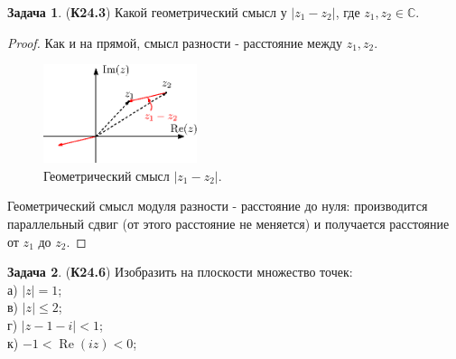 \documentclass[12pt]{article}
\newcommand{\MC}{\mathbb{C}}
\theoremstyle{definition}
\newtheorem{problem}{Задача}
\DeclareMathOperator{\RE}{\operatorname{Re}}
\begin{document}
\begin{problem}(\textbf{К24.3}) 
	Какой геометрический смысл у $|z_1 - z_2|$, где $z_1, z_2 \in \MC$.
\end{problem}
\begin{proof}
	Как и на прямой, смысл разности - расстояние между $z_1,z_2$.
	\begin{figure}[H]
		\centering
		\includegraphics[width=0.4\textwidth]{AL1S1_4.eps}
		\caption{Геометрический смысл $|z_1 - z_2|$.}
		\label{1_4}
	\end{figure}
	Геометрический смысл модуля разности - расстояние до нуля: производится параллельный сдвиг (от этого расстояние не меняется) и получается расстояние от $z_1$ до $z_2$.
\end{proof}
\newpage
\begin{problem}(\textbf{К24.6}) 
	Изобразить на плоскости множество точек:\hfill\\
	а) $|z| = 1$;\\
	в) $|z| \leq 2$;\\
	г) $|z - 1 - i| < 1$;\\
	к) $-1 < \RE{(iz)} < 0$;
\end{problem}
\end{document}
